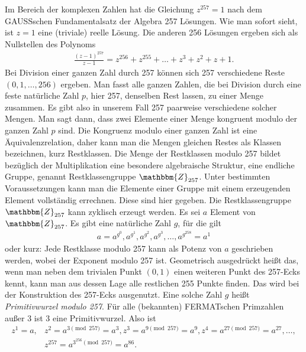 \documentclass[11pt]{article}
\newcommand{\br}[1]{\ensuremath{\left(#1\right)}}
\newcommand{\Z}{\mathbbm{Z}}
\begin{document}
Im Bereich der komplexen Zahlen hat die Gleichung $z^{257} = 1$ nach dem
GAUSSschen Fundamentalsatz der Algebra 257 Lösungen. Wie man sofort sieht, ist
$z = 1$ eine (triviale) reelle Lösung. Die anderen 256 Lösungen ergeben sich
als Nullstellen des Polynoms
\begin{gather*}
   \frac{\br{z - 1}^{257}}{z - 1} = z^{256} + z^{255} + \ldots + z^3 + z^2 + z
   + 1.
\end{gather*}
Bei Division einer ganzen Zahl durch 257 können sich 257 verschiedene Reste
$(0, 1, \ldots, 256)$ ergeben. Man fasst alle ganzen Zahlen, die bei Division
durch eine feste natürliche Zahl $p$, hier 257, denselben Rest lassen, zu
einer Menge zusammen. Es gibt also in unserem Fall 257 paarweise verschiedene
solcher Mengen. Man sagt dann, dass zwei Elemente einer Menge kongruent modulo
der ganzen Zahl $p$ sind. Die Kongruenz modulo einer ganzen Zahl ist eine
Äquivalenzrelation, daher kann man die Mengen gleichen Restes als Klassen
bezeichnen, kurz Restklassen. Die Menge der Restklassen modulo 257 bildet
bezüglich der Multiplikation eine besondere algebraische Struktur, eine
endliche Gruppe, genannt Restklassengruppe $\Z_{257}$. Unter bestimmten
Voraussetzungen kann man die Elemente einer Gruppe mit einem erzeugenden
Element vollständig errechnen. Diese sind hier gegeben. Die Restklassengruppe
$\Z_{257}$ kann zyklisch erzeugt werden. Es sei $a$ Element von $\Z_{257}$. Es
gibt eine natürliche Zahl $g$, für die gilt
\begin{gather*}
  a = a^{g^0}, a^{g^1}, a^{g^2}, a^{g^3}, \ldots, a^{g^{258}} = a^1 
\end{gather*}
oder kurz: Jede Restklasse modulo 257 kann als Potenz von $a$ geschrieben
werden, wobei der Exponent modulo 257 ist. Geometrisch ausgedrückt heißt das,
wenn man neben dem trivialen Punkt $(0,1)$ einen weiteren Punkt des 257-Ecks
kennt, kann man aus dessen Lage alle restlichen 255 Punkte finden. Das wird
bei der Konstruktion des 257-Ecks ausgenutzt. Eine solche Zahl $g$ heißt
\emph{Primitivwurzel modulo 257}. Für alle (bekannten) FERMATschen Primzahlen
außer 3 ist 3 eine Primitivwurzel. Also ist
\begin{align*}
  z^1 = a,& z^2 = a^{3 \pmod{257}}= a^3, z^3 = a^{9 \pmod{257}} =a^9, z^4 =
  a^{27 \pmod{257}} = a^{27}, \ldots,\\& z^{257} = a^{3^{256} \pmod{257}} =
  a^{86}.
\end{align*}
\end{document}
